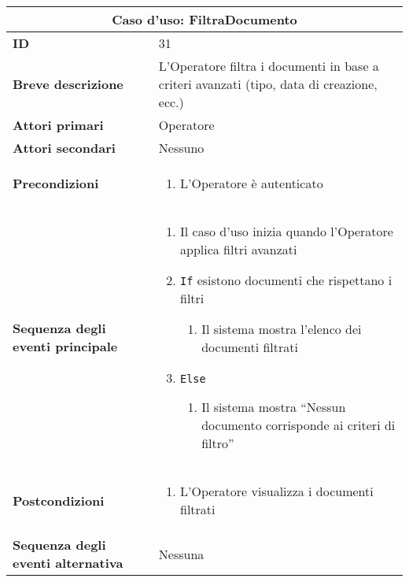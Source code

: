 \documentclass[a4paper]{report}
\begin{document}
\clearpage
\begin{table}[H]
\vspace*{-0cm}
\renewcommand{\arraystretch}{1.9}
\begin{tabular}{|p{3.9cm}|p{9.9cm}|}
\hline
\multicolumn{2}{|c|}{\textbf{Caso d’uso: FiltraDocumento}} \\ \hline
	\textbf{ID} & 31 \\ \hline
	\textbf{Breve descrizione} & L'Operatore filtra i documenti in base a criteri avanzati (tipo, data di creazione, ecc.)  \\ \hline
	\textbf{Attori primari} & Operatore  \\ \hline
	\textbf{Attori secondari} & Nessuno \\ \hline
	\textbf{Precondizioni} & \begin{enumerate}[leftmargin=14pt,label=\arabic*.,labelsep=0.5em,topsep=0pt,partopsep=0pt,parsep=0pt,itemsep=0pt]
        \item L’Operatore è autenticato
    \end{enumerate} \\ \hline
	\textbf{Sequenza degli eventi principale} & 
\begin{enumerate}[leftmargin=14pt,label=\arabic*.,labelsep=0.5em,topsep=0pt,partopsep=0pt,parsep=0pt,itemsep=0pt]
    \item Il caso d’uso inizia quando l’Operatore applica filtri avanzati
    \item \texttt{If} esistono documenti che rispettano i filtri
    \begin{enumerate}[label=\arabic{enumi}.\arabic*.,leftmargin=22pt,labelsep=0.5em,topsep=0pt,partopsep=0pt,parsep=0pt,itemsep=0pt]
        \item Il sistema mostra l'elenco dei documenti filtrati
    \end{enumerate}
    \item \texttt{Else}
    \begin{enumerate}[label=\arabic{enumi}.\arabic*.,leftmargin=22pt,labelsep=0.5em,topsep=0pt,partopsep=0pt,parsep=0pt,itemsep=0pt]
        \item Il sistema mostra “Nessun documento corrisponde ai criteri di filtro”
    \end{enumerate}
\end{enumerate}\\ \hline
	\textbf{Postcondizioni} & \begin{enumerate}[label=\arabic*.,leftmargin=14pt,labelsep=0.5em,topsep=0pt,partopsep=0pt,parsep=0pt,itemsep=0pt]
        \item L’Operatore visualizza i documenti filtrati
    \end{enumerate} \\ \hline
	\textbf{Sequenza degli eventi alternativa} & Nessuna \\ \hline
\end{tabular}
\end{table}
\end{document}
